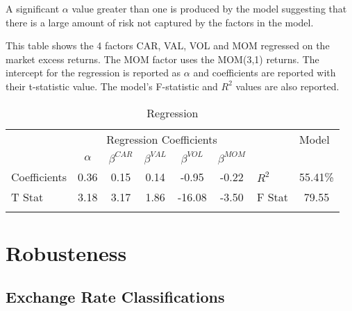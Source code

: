 \documentclass{article}
\begin{document}
A significant $\alpha$ value greater than one is produced by the model suggesting that there is a large amount of risk not captured by the factors in the model.\\

\begin{table}[hbp!]
  \centering
  \caption{Regression}
  This table shows the 4 factors CAR, VAL, VOL and MOM regressed on the market excess returns. The MOM factor uses the MOM(3,1) returns. The intercept for the regression is reported as $\alpha$ and coefficients are reported with their t-statistic value. The model's F-statistic and $R^2$ values are also reported.
    \begin{tabular}{rrrrrrrr}
          &       &       &       &       &       &       &  \\
    \midrule
          & \multicolumn{5}{c}{Regression Coefficients} &       & \multicolumn{1}{l}{Model} \\
          & \multicolumn{1}{c}{$\alpha$} & \multicolumn{1}{c}{$\beta^{CAR}$} & \multicolumn{1}{c}{$\beta^{VAL}$} & \multicolumn{1}{c}{$\beta^{VOL}$} & \multicolumn{1}{c}{$\beta^{MOM}$} &       &  \\
\cmidrule{2-6}\cmidrule{8-8}    \multicolumn{1}{l}{Coefficients} & \multicolumn{1}{c}{0.36} & \multicolumn{1}{c}{0.15} & \multicolumn{1}{c}{0.14} & \multicolumn{1}{c}{-0.95} & \multicolumn{1}{c}{-0.22} & \multicolumn{1}{l}{$R^2$} & \multicolumn{1}{c}{55.41\%} \\
    \multicolumn{1}{l}{T Stat} & \multicolumn{1}{c}{3.18} & \multicolumn{1}{c}{3.17} & \multicolumn{1}{c}{1.86} & \multicolumn{1}{c}{-16.08} & \multicolumn{1}{c}{-3.50} & \multicolumn{1}{l}{F Stat} & \multicolumn{1}{c}{79.55} \\
    \midrule
          &       &       &       &       &       &       &  \\
    \end{tabular}%
  \label{REG}%
\end{table}%

\newpage
\section{Robusteness}
\subsection{Exchange Rate Classifications}
\end{document}
